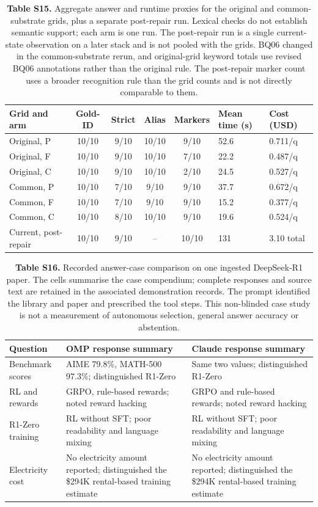 \begin{table}
\centering
\small
\setlength{\tabcolsep}{4pt}
\caption{\textbf{Table S15.} Aggregate answer and runtime proxies for the original and
common-substrate grids, plus a separate post-repair run. Lexical checks do
not establish semantic support; each arm is one run. The post-repair run is
a single current-state observation on a later stack and is not pooled with
the grids. BQ06 changed in the common-substrate rerun, and original-grid
keyword totals use revised BQ06 annotations rather than the original rule.
The post-repair
marker count uses a broader recognition rule than the grid counts and is not
directly comparable to them.}

\begin{tabular}{@{}p{3.960cm}*{4}{c}p{1.980cm}p{2.475cm}@{}}
\toprule
Grid and arm & Gold-ID & Strict & Alias & Markers & Mean time (s) & Cost (USD)\\
\midrule
Original, P & 10/10 & 9/10 & 10/10 & 9/10 & 52.6 & 0.711/q\\
Original, F & 10/10 & 9/10 & 10/10 & 7/10 & 22.2 & 0.487/q\\
Original, C & 10/10 & 9/10 & 10/10 & 2/10 & 24.5 & 0.527/q\\
Common, P & 10/10 & 7/10 & 9/10 & 9/10 & 37.7 & 0.672/q\\
Common, F & 10/10 & 7/10 & 9/10 & 9/10 & 15.2 & 0.377/q\\
Common, C & 10/10 & 8/10 & 10/10 & 9/10 & 19.6 & 0.524/q\\
Current, post-repair & 10/10 & 9/10 & -- & 10/10 & 131 & 3.10 total\\
\bottomrule
\end{tabular}
\end{table}
\begin{table}
\centering\small
\caption{\textbf{Table S16.} Recorded answer-case comparison on one ingested DeepSeek-R1 paper.
The cells summarise the case compendium; complete responses and source text
are retained in the associated demonstration records. The prompt identified
the library and paper and prescribed the tool steps. This non-blinded case
study is not a measurement of autonomous selection, general answer accuracy or
abstention.}

\begin{tabular}{@{}p{2.970cm}p{5.775cm}p{5.775cm}@{}}
\toprule
Question & OMP response summary & Claude response summary \\
\midrule
Benchmark scores & AIME 79.8\%, MATH-500 97.3\%; distinguished R1-Zero & Same two values; distinguished R1-Zero \\
RL and rewards & GRPO, rule-based rewards; noted reward hacking & GRPO and rule-based rewards; noted reward hacking \\
R1-Zero training & RL without SFT; poor readability and language mixing & RL without SFT; poor readability and language mixing \\
Electricity cost & No electricity amount reported; distinguished the \$294K rental-based training estimate & No electricity amount reported; distinguished the \$294K rental-based training estimate \\
\bottomrule
\end{tabular}
\end{table}
